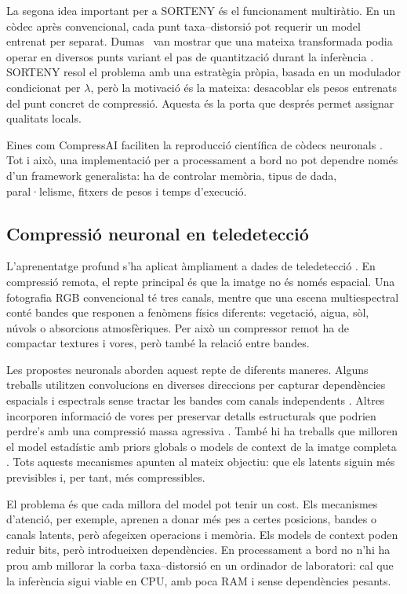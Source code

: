 La segona idea important per a SORTENY és el funcionament multiràtio. En un
còdec après convencional, cada punt taxa--distorsió pot requerir un model
entrenat per separat. Dumas \etal\ van mostrar que una mateixa transformada
podia operar en diversos punts variant el pas de quantització durant la
inferència \cite{dumas2018quantization}. SORTENY resol el problema amb una
estratègia pròpia, basada en un modulador condicionat per $\lambda$, però la
motivació és la mateixa: desacoblar els pesos entrenats del punt concret de
compressió. Aquesta és la porta que després permet assignar qualitats locals.

Eines com CompressAI faciliten la reproducció científica de còdecs neuronals
\cite{begaint2020compressai}. Tot i això, una implementació per a processament
a bord no pot dependre només d'un framework generalista: ha de controlar
memòria, tipus de dada, paral·lelisme, fitxers de pesos i temps d'execució.

\subsection{Compressió neuronal en teledetecció}

L'aprenentatge profund s'ha aplicat àmpliament a dades de teledetecció
\cite{zhu2017deep}. En compressió remota, el repte principal és que la imatge
no és només espacial. Una fotografia RGB convencional té tres canals, mentre que
una escena multiespectral conté bandes que responen a fenòmens físics diferents:
vegetació, aigua, sòl, núvols o absorcions atmosfèriques. Per això un compressor
remot ha de compactar textures i vores, però també la relació entre bandes.

Les propostes neuronals aborden aquest repte de diferents maneres. Alguns
treballs utilitzen convolucions en diverses direccions per capturar dependències
espacials i espectrals sense tractar les bandes com canals independents
\cite{kong2022spectral}. Altres incorporen informació de vores per preservar
detalls estructurals que podrien perdre's amb una compressió massa agressiva
\cite{guo2023edge}. També hi ha treballs que milloren el model estadístic amb
priors globals o models de context de la imatge completa \cite{zhang2024global}.
Tots aquests mecanismes apunten al mateix objectiu: que els latents siguin més
previsibles i, per tant, més compressibles.

El problema és que cada millora del model pot tenir un cost. Els mecanismes
d'atenció, per exemple, aprenen a donar més pes a certes posicions, bandes o
canals latents, però afegeixen operacions i memòria. Els models de context poden
reduir bits, però introdueixen dependències. En processament a bord no n'hi ha
prou amb millorar la corba taxa--distorsió en un ordinador de laboratori: cal
que la inferència sigui viable en CPU, amb poca RAM i sense dependències pesants.

